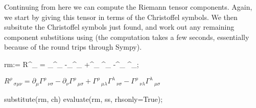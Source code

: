 \documentclass[10pt]{article}
\newcommand{\algo}[1]{{\tt \detokenize{#1}}}
\begin{document}
Continuing from here we can compute the Riemann tensor components. Again, we start
by giving this tensor in terms of the Christoffel symbols. We then subsitute the 
Christoffel symbols just found, and work out any remaining component substitions using
\algo{evaluate} (the computation takes a few seconds, essentially because of the round
trips through Sympy).
\begin{python}
rm:= R^{\rho}_{\sigma\mu\nu} = \partial_{\mu}{\Gamma^{\rho}_{\nu\sigma}}
                                  -\partial_{\nu}{\Gamma^{\rho}_{\mu\sigma}}
                                  +\Gamma^{\rho}_{\mu\lambda} \Gamma^{\lambda}_{\nu\sigma}
                                  -\Gamma^{\rho}_{\nu\lambda} \Gamma^{\lambda}_{\mu\sigma};
\end{python}
\begin{adjustwidth}{1em}{0cm}${}R^{\rho}\,_{\sigma \mu \nu} = \partial_{\mu}{\Gamma^{\rho}\,_{\nu \sigma}}-\partial_{\nu}{\Gamma^{\rho}\,_{\mu \sigma}}+\Gamma^{\rho}\,_{\mu \lambda} \Gamma^{\lambda}\,_{\nu \sigma}-\Gamma^{\rho}\,_{\nu \lambda} \Gamma^{\lambda}\,_{\mu \sigma}$\end{adjustwidth}
\begin{python}
substitute(rm, ch)
evaluate(rm, ss, rhsonly=True);
\end{python}
\end{document}

